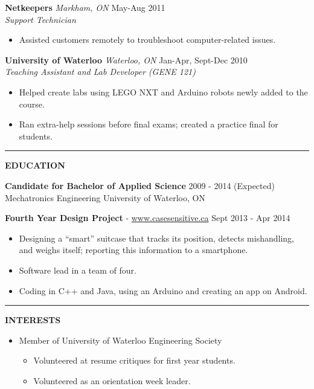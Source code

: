 \documentclass{letter}
\begin{document}
{\bf Netkeepers} {\sl Markham, ON} \hfill May-Aug 2011 \\
{\sl Support Technician}
\begin{itemize}
  \item Assisted customers remotely to troubleshoot computer-related issues.
\end{itemize}

{\bf University of Waterloo} {\sl Waterloo, ON} \hfill Jan-Apr, Sept-Dec 2010 \\
{\sl Teaching Assistant and Lab Developer (GENE 121)}
\begin{itemize}
  \item Helped create labs using LEGO NXT and Arduino robots newly added to the course.
  \item Ran extra-help sessions before final exams; created a practice final for students.
\end{itemize}

\vskip 2pt
\hrule
{\large\bf EDUCATION}

{\bf Candidate for Bachelor of Applied Science} \hfill 2009 - 2014 (Expected) \\
Mechatronics Engineering \hfill University of Waterloo, ON

{\bf Fourth Year Design Project} - \href{http://www.casesensitive.ca}{www.casesensitive.ca} \hfill Sept 2013 - Apr 2014
\begin{itemize}
  \item Designing a ``smart'' suitcase that tracks its position, detects mishandling, and weighs itself; reporting this information to a smartphone.
  \item Software lead in a team of four.
  \item Coding in C++ and Java, using an Arduino and creating an app on Android.
\end{itemize}

\vskip 2pt
\hrule
{\large\bf INTERESTS}
\begin{itemize}
  \item Member of University of Waterloo Engineering Society
  \begin{itemize}
    \item Volunteered at resume critiques for first year students.
    \item Volunteered as an orientation week leader.
  \end{itemize}
\end{itemize}
\end{document}
